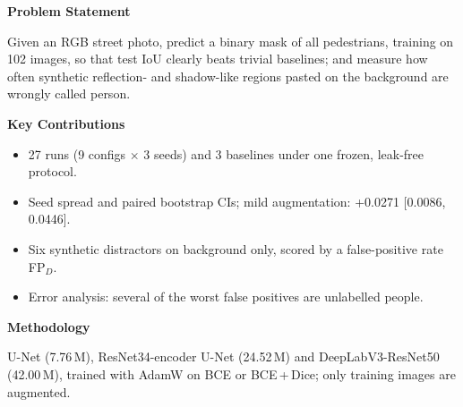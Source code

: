 \documentclass{article}
\newcommand{\panelhead}[1]{{\color{navy}\bfseries\fontsize{30}{34}\selectfont #1\par\vspace{6pt}}}
\newcommand{\bodytext}{\fontsize{20}{26}\selectfont}
\begin{document}
{\begin{minipage}[t]{0.325\textwidth}
\begin{panel}[panelblue]{\linewidth}
\vspace{9pt}
\panelhead{Problem Statement}
Given an RGB street photo, predict a binary mask of all pedestrians, training on 102 images, so that test IoU clearly beats trivial baselines; and measure how often synthetic reflection- and shadow-like regions pasted on the background are wrongly called person.
\end{panel}
\end{minipage}%
\begin{minipage}[t]{0.375\textwidth}
\vspace{0pt}\hspace{6pt}\begin{panel}[panelpeach]{\dimexpr\linewidth-6pt}
\bodytext
\panelhead{Key Contributions}
\begin{itemize}\setlength\itemsep{4pt}
\item 27 runs (9 configs $\times$ 3 seeds) and 3 baselines under one frozen, leak-free protocol.
\item Seed spread and paired bootstrap CIs; mild augmentation: +0.0271 [0.0086, 0.0446].
\item Six synthetic distractors on background only, scored by a false-positive rate FP$_D$.
\item Error analysis: several of the worst false positives are unlabelled people.
\end{itemize}

\vspace{7pt}
\panelhead{Methodology}
U-Net (7.76\,M), ResNet34-encoder U-Net (24.52\,M) and DeepLabV3-ResNet50 (42.00\,M), trained with AdamW on BCE or BCE\,+\,Dice; only training images are augmented.


\end{panel}
\end{minipage}}
\end{document}

